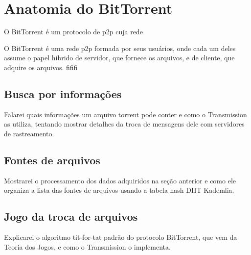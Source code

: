 
\chapter{Anatomia do BitTorrent}

O BitTorrent é um protocolo de \gls*{p2p} cuja rede

O BitTorrent é uma rede \gls{p2p} formada por seus usuários, onde cada um deles assume
o papel híbrido de servidor, que fornece os arquivos, e de cliente, que adquire os
arquivos. fififi

\section{Busca por informações}

Falarei quais informações um arquivo torrent pode conter e como o Transmission as
utiliza, tentando mostrar detalhes da troca de mensagens dele com servidores de
rastreamento.

\section{Fontes de arquivos}

Mostrarei o processamento dos dados adquiridos na seção anterior e como ele organiza a lista das fontes de arquivos usando a tabela hash DHT Kademlia.

\section{Jogo da troca de arquivos}

Explicarei o algoritmo tit-for-tat padrão do protocolo BitTorrent, que vem da Teoria dos Jogos, e como o Transmission o implementa.

\afterpage{\clearpage}